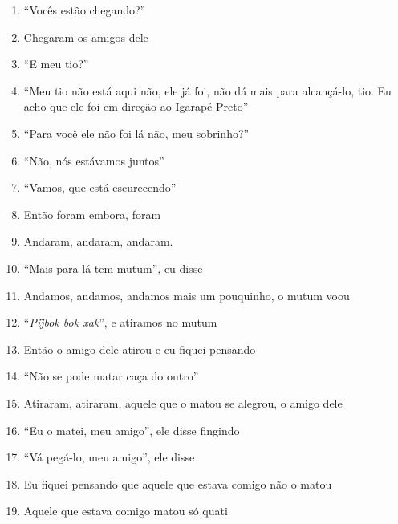 \begin{enumerate}
 \item ``Vocês estão chegando?''

 \item Chegaram os amigos dele

 \item ``E meu tio?''

 \item ``Meu tio não está aqui não, ele já foi, não dá mais para
 alcançá-lo, tio. Eu acho que ele foi em direção ao Igarapé Preto''

 \item ``Para você ele não foi lá não, meu sobrinho?''

 \item ``Não, nós estávamos juntos''

 \item ``Vamos, que está escurecendo''

 \item Então foram embora, foram

 \begin{center}\end{center}

 \item Andaram, andaram, andaram.

 \item ``Mais para lá tem mutum'', eu disse

 \item Andamos, andamos, andamos mais um pouquinho, o mutum voou

 \item ``\textit{Pij̃bok bok xak}'', e atiramos no mutum

 \item Então o amigo dele atirou e eu fiquei pensando

 \item ``Não se pode matar caça do outro''

 \item Atiraram, atiraram, aquele que o matou se alegrou, o amigo dele

 \item ``Eu o matei, meu amigo'', ele disse fingindo

 \item ``Vá pegá-lo, meu amigo'', ele disse

 \item Eu fiquei pensando que aquele que estava comigo não o matou

 \item Aquele que estava comigo matou só quati


\end{enumerate}
